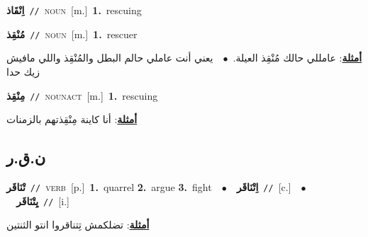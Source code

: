 \documentclass[10pt,a4paper,twoside]{article} %
\begin{document}
\begin{multicols}{2}
{\setlength\topsep{0pt}\textbf{\foreignlanguage{arabic}{اِنْقَاذ}}\ {\color{gray}\texttt{//}\color{black}}\ \textsc{noun}\ [m.]\ \textbf{1.}~rescuing\ } \vspace{2mm}

{\setlength\topsep{0pt}\textbf{\foreignlanguage{arabic}{مُنْقِذ}}\ {\color{gray}\texttt{//}\color{black}}\ \textsc{noun}\ [m.]\ \textbf{1.}~rescuer\  \begin{flushright}\color{gray}\foreignlanguage{arabic}{\textbf{\underline{\foreignlanguage{arabic}{أمثلة}}}: عامللي حالك مُنْقِذ العيلة.\ $\bullet$\ \  يعني أنت عاملي حالم البطل والمُنْقِذ واللي مافيش زيك حدا}\end{flushright}\color{black}} \vspace{2mm}

{\setlength\topsep{0pt}\textbf{\foreignlanguage{arabic}{مِنْقِذ}}\ {\color{gray}\texttt{//}\color{black}}\ \textsc{noun\textunderscore act}\ [m.]\ \textbf{1.}~rescuing\  \begin{flushright}\color{gray}\foreignlanguage{arabic}{\textbf{\underline{\foreignlanguage{arabic}{أمثلة}}}: أنا كاينة مِنْقِذتهم بالزمنات}\end{flushright}\color{black}} \vspace{2mm}

\vspace{-3mm}
\subsection*{\color{blue}\foreignlanguage{arabic}{ن.ق.ر}\color{blue}{}} 

{\setlength\topsep{0pt}\textbf{\foreignlanguage{arabic}{تْنَاقَر}}\ {\color{gray}\texttt{//}\color{black}}\ \textsc{verb}\ [p.]\ \textbf{1.}~quarrel  \textbf{2.}~argue  \textbf{3.}~fight\ \ $\bullet$\ \ \setlength\topsep{0pt}\textbf{\foreignlanguage{arabic}{اِتْنَاقَر}}\ {\color{gray}\texttt{//}\color{black}}\ [c.]\ \ $\bullet$\ \ \setlength\topsep{0pt}\textbf{\foreignlanguage{arabic}{يِتْنَاقَر}}\ {\color{gray}\texttt{//}\color{black}}\ [i.]\  \begin{flushright}\color{gray}\foreignlanguage{arabic}{\textbf{\underline{\foreignlanguage{arabic}{أمثلة}}}: تضلكمش تِتناقروا انتو الثنتين}\end{flushright}\color{black}} \vspace{2mm}


\end{multicols}
\end{document}
